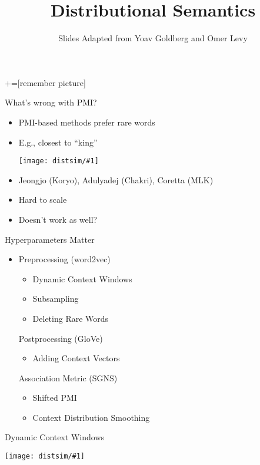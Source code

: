 \documentclass[compress]{beamer}
\title{Distributional Semantics}
\date{Slides Adapted from Yoav Goldberg and Omer Levy}
\newcommand{\gfx}[2]{
\begin{center}
	\texttt{[image: distsim/\#1]}
\end{center}
}
\begin{document}
+=[remember picture]



\begin{frame}
  \titlepage
\end{frame}

\begin{frame}{What's wrong with PMI?}

\begin{itemize}
  \item PMI-based methods prefer rare words
  \item E.g., closest to ``king''
    \gfx{king}{.8}
  \item Jeongjo (Koryo), Adulyadej (Chakri), Coretta (MLK)
  \item Hard to scale
  \item Doesn't work as well?
\end{itemize}

\end{frame}


\begin{frame}{Hyperparameters Matter}

\begin{itemize}
\item Preprocessing				(word2vec)
\begin{itemize}
\item \alert<2>{Dynamic Context Windows}
\item Subsampling
\item Deleting Rare Words
\end{itemize}

Postprocessing				(GloVe)
\begin{itemize}
\item \alert<2>{Adding Context Vectors}
\end{itemize}

Association Metric			(SGNS)
\begin{itemize}
\item Shifted PMI
\item \alert<2>{Context Distribution Smoothing}
\end{itemize}

\end{itemize}



\end{frame}

\begin{frame}{Dynamic Context Windows}

\gfx{window}{.95}

\end{frame}
\end{document}
